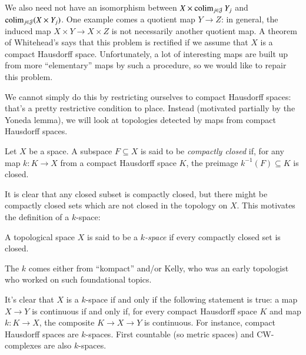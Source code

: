 We also need not have an isomorphism between
$X\times\operatorname{colim}_{j\in \mathcal J}Y_j$ and $\operatorname{colim}_{j\in \mathcal J}(X\times Y_j)$.
One example comes a quotient map $Y\to Z$: 
in general, the induced map $X\times Y\to X\times Z$ is not necessarily another quotient map.
A theorem of Whitehead's says that this problem is rectified if we assume that $X$ is
a compact Hausdorff space.
Unfortunately, a lot of interesting maps are built up from more ``elementary'' maps by such a procedure,
so we would like to repair this problem.

We cannot simply do this by restricting ourselves to compact Hausdorff spaces:
that's a pretty restrictive condition to place.
Instead (motivated partially by the Yoneda lemma),
we will look at topologies detected by maps from compact Hausdorff spaces.
\begin{definition}
    Let $X$ be a space.
    A subspace $F\subseteq X$ is said to be \emph{compactly closed} if,
    for any map $k:K\to X$ from a compact Hausdorff space $K$, 
    the preimage $k^{-1}(F)\subseteq K$ is closed.
\end{definition}
It is clear that any closed subset is compactly closed, but
there might be compactly closed sets which are not closed in the topology on $X$.
This motivates the definition of a $k$-space:
\begin{definition}
    A topological space $X$ is said to be a \emph{$k$-space}
    if every compactly closed set is closed.
\end{definition}
The $k$ comes either from ``kompact'' and/or Kelly, who was an early topologist
who worked on such foundational topics.

It's clear that $X$ is a $k$-space if and only if the following statement is true:
a map $X\to Y$ is continuous if and only if, for every compact Hausdorff space $K$ and map $k:K\to X$,
the composite $K\to X\to Y$ is continuous.
For instance, compact Hausdorff spaces are $k$-spaces. First countable (so metric spaces) and CW-complexes are also $k$-spaces.

